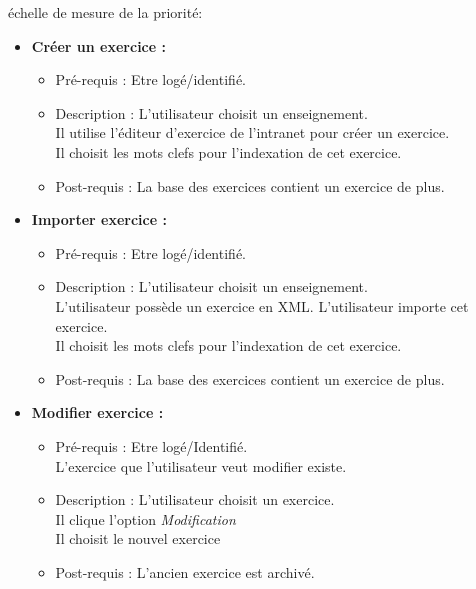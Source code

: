 \begin{center}
{\'e}chelle de mesure de la priorit{\'e}:

\end{center}

\begin{itemize}
\item {\bf Cr{\'e}er un exercice :}
	\begin{itemize}
	\item Pr{\'e}-requis : Etre log{\'e}/identifi{\'e}.
	\item Description : L'utilisateur choisit un enseignement.\\
	Il utilise l'{\'e}diteur d'exercice de l'intranet pour cr{\'e}er un exercice.\\
	Il choisit les mots clefs pour l'indexation de cet exercice.
	\item Post-requis : La base des exercices contient un exercice de plus. 
	\end{itemize}

\item  {\bf Importer exercice : }
	\begin{itemize}
	\item Pr{\'e}-requis : Etre log{\'e}/identifi{\'e}.
	\item Description : L'utilisateur choisit un enseignement.\\
	L'utilisateur poss{\`e}de un exercice en XML.
	L'utilisateur importe cet exercice.\\
	Il choisit les mots clefs pour l'indexation de cet exercice.
	\item Post-requis : La base des exercices contient un exercice de plus. 
	\end{itemize}

\item  {\bf Modifier exercice :}
 	\begin{itemize}
	\item Pr{\'e}-requis : Etre log{\'e}/Identifi{\'e}.\\
	L'exercice que l'utilisateur veut modifier existe.
	\item Description : L'utilisateur choisit un exercice.\\
	Il clique l'option {\it Modification}\\
	Il choisit le nouvel exercice 
	\item Post-requis : L'ancien exercice est archiv{\'e}.
	\end{itemize}


\end{itemize}
